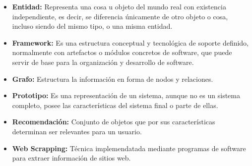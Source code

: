 \begin{itemize}
  \item \textbf{Entidad:} Representa una cosa u objeto del mundo real con existencia independiente, es decir, se diferencia únicamente de otro objeto o cosa, incluso siendo del mismo tipo, o una misma entidad.
  \item \textbf{Framework: }Es una estructura conceptual y tecnológica de soporte definido, normalmente con artefactos o módulos concretos de software, que puede servir de base para la organización y desarrollo de software. 
   \item \textbf{Grafo:} Estructura la información en forma de nodos y relaciones.
   \item \textbf{Prototipo:} Es una representación de un sistema, aunque no es un sistema completo, posee las características del sistema final o parte de ellas.
   \item \textbf{Recomendación:} Conjunto de objetos que por sus características determinan ser relevantes para un usuario. 
   \item \textbf{Web Scrapping:} Técnica implemendatada mediante programas de software para extraer información de sitios web.
\end{itemize}
